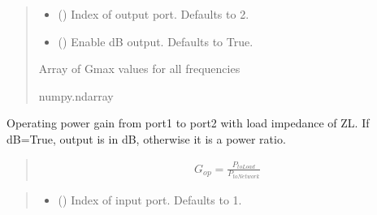 \documentclass[letterpaper,10pt,english]{sphinxmanual}
\begin{document}
\begin{fulllineitems}
\begin{fulllineitems}
\begin{quote}
\begin{description}
\begin{itemize}
\item {} 
\sphinxAtStartPar
{} (\sphinxstyleliteralemphasis{\sphinxupquote{, }}) \textendash{} Index of output port. Defaults to 2.

\item {} 
\sphinxAtStartPar
{} (\sphinxstyleliteralemphasis{\sphinxupquote{, }}) \textendash{} Enable dB output. Defaults to True.

\end{itemize}

\sphinxAtStartPar
Array of Gmax values for all frequencies

\sphinxAtStartPar
numpy.ndarray

\end{description}\end{quote}

\end{fulllineitems}


\begin{fulllineitems}
\label{\detokenize{touchstone:touchstone.spfile.gop}}
\pysigstartsignatures
{}
\pysigstopsignatures
\sphinxAtStartPar
Operating power gain from port1 to port2 with load impedance of ZL. If dB=True, output is in dB, otherwise it is a power ratio.
\begin{quote}
\begin{equation*}
\begin{split}G_{op}=\frac{P_{toLoad}}{P_{toNetwork}}\end{split}
\end{equation*}\end{quote}
\begin{quote}\begin{description}
\begin{itemize}
\item {} 
\sphinxAtStartPar
{} (\sphinxstyleliteralemphasis{\sphinxupquote{, }}) \textendash{} Index of input port. Defaults to 1.


\end{itemize}
\end{description}
\end{quote}
\end{fulllineitems}
\end{fulllineitems}
\end{document}
